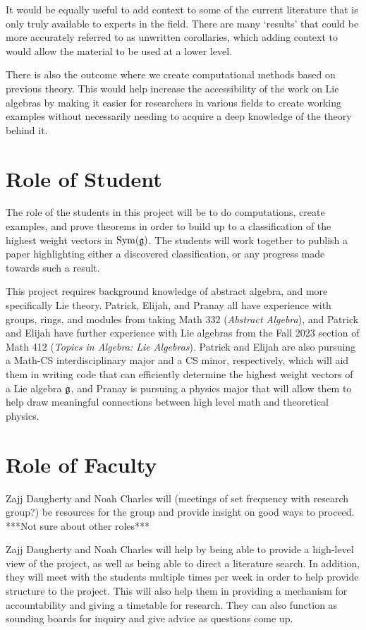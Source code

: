 \documentclass[11pt, reqno]{amsart}
\begin{document}
It would be equally useful to add context to some of the current literature that is only truly available to experts in the field. There are many `results' that could be more accurately referred to as unwritten corollaries, which adding context to would allow the material to be used at a lower level.

There is also the outcome where we create computational methods based on previous theory. This would help increase the accessibility of the work on Lie algebras by making it easier for researchers in various fields to create working examples without necessarily needing to acquire a deep knowledge of the theory behind it.


\section{Role of Student}

The role of the students in this project will be to do computations, create examples, and prove theorems in order to build up to a classification of the highest weight vectors in $\operatorname{Sym}(\mathfrak{g})$. The students will work together to publish a paper highlighting either a discovered classification, or any progress made towards such a result. 

This project requires background knowledge of abstract algebra, and more specifically Lie theory. Patrick, Elijah, and Pranay all have experience with groups, rings, and modules from taking Math 332 (\emph{Abstract Algebra}), and Patrick and Elijah have further experience with Lie algebras from the Fall 2023 section of Math 412 (\emph{Topics in Algebra: Lie Algebras}). Patrick and Elijah are also pursuing a Math-CS interdisciplinary major and a CS minor, respectively, which will aid them in writing code that can efficiently determine the highest weight vectors of a Lie algebra $\mathfrak{g}$, and Pranay is pursuing a physics major that will allow them to help draw meaningful connections between high level math and theoretical physics.


\section{Role of Faculty}

Zajj Daugherty and Noah Charles will (meetings of set frequency with research group?) be resources for the group and provide insight on good ways to proceed. ***Not sure about other roles***

Zajj Daugherty and Noah Charles will help by being able to provide a high-level view of the project, as well as being able to direct a literature search. In addition, they will meet with the students multiple times per week in order to help provide structure to the project. This will also help them in providing a mechanism for accountability and giving a timetable for research. They can also function as sounding boards for inquiry and give advice as questions come up.
\end{document}
